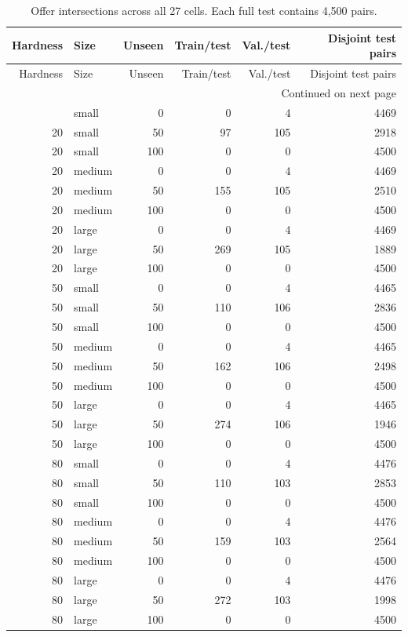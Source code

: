 \documentclass[11pt,letterpaper]{article}
\begin{document}
\small\begin{longtable}{rlrrrr}
\caption{Offer intersections across all 27 cells. Each full test contains 4,500 pairs.}\\
\toprule Hardness & Size & Unseen & Train/test & Val./test & Disjoint test pairs\\\midrule\endfirsthead
\toprule Hardness & Size & Unseen & Train/test & Val./test & Disjoint test pairs\\\midrule\endhead
\midrule\multicolumn{6}{r}{Continued on next page}\\\endfoot
\bottomrule\endlastfoot
20 & small & 0 & 0 & 4 & 4469\\
20 & small & 50 & 97 & 105 & 2918\\
20 & small & 100 & 0 & 0 & 4500\\
20 & medium & 0 & 0 & 4 & 4469\\
20 & medium & 50 & 155 & 105 & 2510\\
20 & medium & 100 & 0 & 0 & 4500\\
20 & large & 0 & 0 & 4 & 4469\\
20 & large & 50 & 269 & 105 & 1889\\
20 & large & 100 & 0 & 0 & 4500\\
50 & small & 0 & 0 & 4 & 4465\\
50 & small & 50 & 110 & 106 & 2836\\
50 & small & 100 & 0 & 0 & 4500\\
50 & medium & 0 & 0 & 4 & 4465\\
50 & medium & 50 & 162 & 106 & 2498\\
50 & medium & 100 & 0 & 0 & 4500\\
50 & large & 0 & 0 & 4 & 4465\\
50 & large & 50 & 274 & 106 & 1946\\
50 & large & 100 & 0 & 0 & 4500\\
80 & small & 0 & 0 & 4 & 4476\\
80 & small & 50 & 110 & 103 & 2853\\
80 & small & 100 & 0 & 0 & 4500\\
80 & medium & 0 & 0 & 4 & 4476\\
80 & medium & 50 & 159 & 103 & 2564\\
80 & medium & 100 & 0 & 0 & 4500\\
80 & large & 0 & 0 & 4 & 4476\\
80 & large & 50 & 272 & 103 & 1998\\
80 & large & 100 & 0 & 0 & 4500\\
\end{longtable}\normalsize
\end{document}
